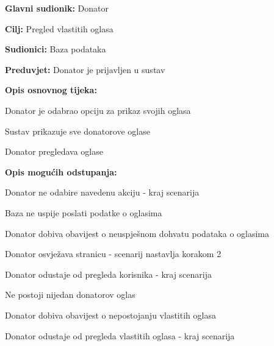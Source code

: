 					\noindent {}
					\begin{packed_item}
	
						\item \textbf{Glavni sudionik: }Donator
						\item  \textbf{Cilj:} Pregled vlastitih oglasa
						\item  \textbf{Sudionici:} Baza podataka
						\item  \textbf{Preduvjet:} Donator je prijavljen u sustav
						\item  \textbf{Opis osnovnog tijeka:}
						
						\item[] \begin{packed_enum}
							\item Donator je odabrao opciju za prikaz svojih oglasa
							\item Sustav prikazuje sve donatorove oglase
							\item Donator pregledava oglase
						\end{packed_enum}

						\item  \textbf{Opis mogućih odstupanja:}

						\item[] \begin{packed_item}
							\item[1.a] Donator ne odabire navedenu akciju - kraj scenarija
							\item[2.a] Baza ne uspije poslati podatke o oglasima
							\item[] \begin{packed_enum}
								
								\item Donator dobiva obavijest o neuspješnom dohvatu podataka o oglasima
								\item
									\begin{packed_enum}
										\item Donator osvježava stranicu - scenarij nastavlja korakom 2
										\item Donator odustaje od pregleda korisnika - kraj scenarija
									\end{packed_enum}
							
							\end{packed_enum}	
							\item[2.b] Ne postoji nijedan donatorov oglas
							\item[] \begin{packed_enum}
								
								\item Donator dobiva obavijest o nepostojanju vlastitih oglasa
								\item Donator odustaje od pregleda vlastitih oglasa - kraj scenarija
							
							\end{packed_enum}
						\end{packed_item}	
					\end{packed_item}
					
